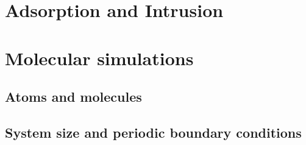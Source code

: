 \documentclass[thesis]{subfiles}
\begin{document}
\newpage
\section{Adsorption and Intrusion}

\newpage
\section{Molecular simulations}

\subsection{Atoms and molecules}

\subsection{System size and periodic boundary conditions}

\OnlyInSubfile{\printbibliography}
\end{document}
